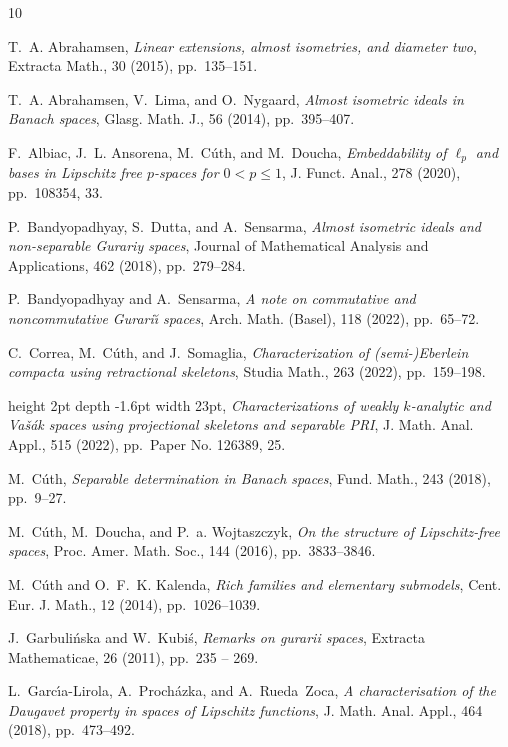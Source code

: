 \documentclass[11pt]{amsart}
\theoremstyle{definition}
\theoremstyle{remark}
\begin{document}
\begin{thebibliography}{10}

{\sc T.~A. Abrahamsen}, {\em Linear extensions, almost isometries, and diameter
  two}, Extracta Math., 30 (2015), pp.~135--151.

{\sc T.~A. Abrahamsen, V.~Lima, and O.~Nygaard}, {\em Almost isometric ideals
  in {B}anach spaces}, Glasg. Math. J., 56 (2014), pp.~395--407.

{\sc F.~Albiac, J.~L. Ansorena, M.~C\'{u}th, and M.~Doucha}, {\em Embeddability
  of {$\ell_p$} and bases in {L}ipschitz free {$p$}-spaces for {$0<p\le1$}}, J.
  Funct. Anal., 278 (2020), pp.~108354, 33.

{\sc P.~Bandyopadhyay, S.~Dutta, and A.~Sensarma}, {\em Almost isometric ideals
  and non-separable {G}urariy spaces}, Journal of Mathematical Analysis and
  Applications, 462 (2018), pp.~279--284.

{\sc P.~Bandyopadhyay and A.~Sensarma}, {\em A note on commutative and
  noncommutative {G}urari\u{\i} spaces}, Arch. Math. (Basel), 118 (2022),
  pp.~65--72.

{\sc C.~Correa, M.~C\'{u}th, and J.~Somaglia}, {\em Characterization of
  (semi-){E}berlein compacta using retractional skeletons}, Studia Math., 263
  (2022), pp.~159--198.

\leavevmode\vrule height 2pt depth -1.6pt width 23pt, {\em Characterizations of
  weakly $k$-analytic and {V}a\v{s}\'{a}k spaces using projectional skeletons
  and separable {PRI}}, J. Math. Anal. Appl., 515 (2022), pp.~Paper No. 126389,
  25.

{\sc M.~C\'{u}th}, {\em Separable determination in {B}anach spaces}, Fund.
  Math., 243 (2018), pp.~9--27.

{\sc M.~C\'{u}th, M.~Doucha, and P.~a. Wojtaszczyk}, {\em On the structure of
  {L}ipschitz-free spaces}, Proc. Amer. Math. Soc., 144 (2016), pp.~3833--3846.

{\sc M.~C\'{u}th and O.~F.~K. Kalenda}, {\em Rich families and elementary
  submodels}, Cent. Eur. J. Math., 12 (2014), pp.~1026--1039.

{\sc J.~Garbuli\'nska and W.~Kubi\'s}, {\em Remarks on gurarii spaces},
  Extracta Mathematicae, 26 (2011), pp.~235 -- 269.

{\sc L.~Garc\'{\i}a-Lirola, A.~Proch\'{a}zka, and A.~Rueda~Zoca}, {\em A
  characterisation of the {D}augavet property in spaces of {L}ipschitz
  functions}, J. Math. Anal. Appl., 464 (2018), pp.~473--492.


\end{thebibliography}
\end{document}

